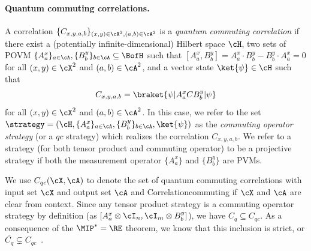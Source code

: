 \paragraph{Quantum commuting correlations. }A correlation $\{C_{x,y,a,b}\}_{(x,y) \in \cX^2, (a,b) \in \cA^2}$ is a \textit{quantum commuting correlation} if there exist a (potentially infinite-dimensional) Hilbert space $\cH$, two sets of POVM $\{ A^x_a \}_{a \in \cA}, \{ B^y_b \}_{b \in \cA} \subseteq \BofH$ such that $[A^x_a, B^y_b] = A^x_a \cdot B^y_b - B^y_b \cdot A^x_a = 0$ for all $(x,y) \in \cX^2$ and $(a,b) \in \cA^2$, and a vector state $\ket{\psi} \in \cH$ such that 
\begin{equation*}
	C_{x,y,a,b} = \braket{\psi|A_a^xC  B_b^y|\psi}
\end{equation*}
for all $(x,y) \in \cX^2$ and $(a,b) \in \cA^2$. In this case, we refer to the set $\strategy= ( \cH, \{ A^x_a \}_{a \in \cA}, \{ B^y_b \}_{b \in \cA}, \ket{\psi})$ as the \textit{commuting operator strategy} (or a $qc$ strategy) which realizes the correlation $C_{x,y,a,b}$. We refer to a strategy (for both tensor product and commuting operator) to be a projective strategy if both the measurement operator $\{A^x_a\}$ and $\{B^y_b\}$ are PVMs. 

We use $C_{qc}(\cX, \cA)$ to denote the set of quantum commuting correlations with input set $\cX$ and output set $\cA$ and \gls{Correlationcommuting} if $\cX$ and $\cA$ are clear from context. Since any tensor product strategy is a commuting operator strategy by definition (as $[A_a^x \otimes \cI_n,\cI_m \otimes B_b^y]$), we have $C_q \subseteq C_{qc}$. As a consequence of the $\MIP^*=\RE$ theorem, we know that this inclusion is strict, or $\overline{C_q} \subsetneq C_{qc}$~\cite{jiMIPRE2022a}. 

